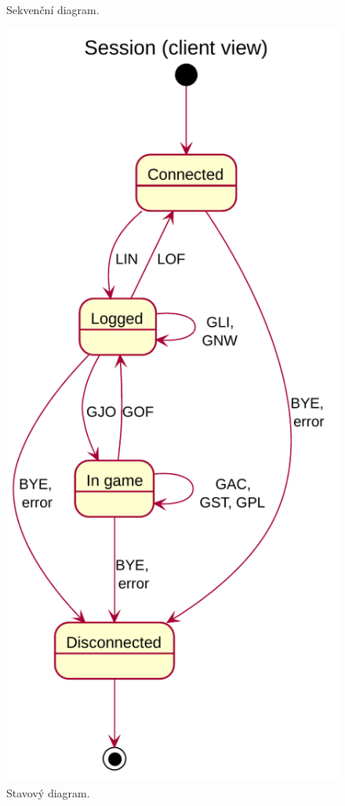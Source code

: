\documentclass[12pt, a4paper]{report}
\begin{document}
\begin{figure}[H]
\begin{minipage}[b]{0.4\textwidth}
		\caption{Sekvenční diagram.}
		\label{fig:sequence-diagram.png}
	\end{minipage}
	\hfill
	\begin{minipage}[b]{0.4\textwidth}
		\includegraphics[width=0.9\linewidth]{state-diagram.pdf}
		\caption{Stavový diagram.}
		\label{fig:{state-diagram.png}}
	\end{minipage}
\end{figure}
\end{document}

